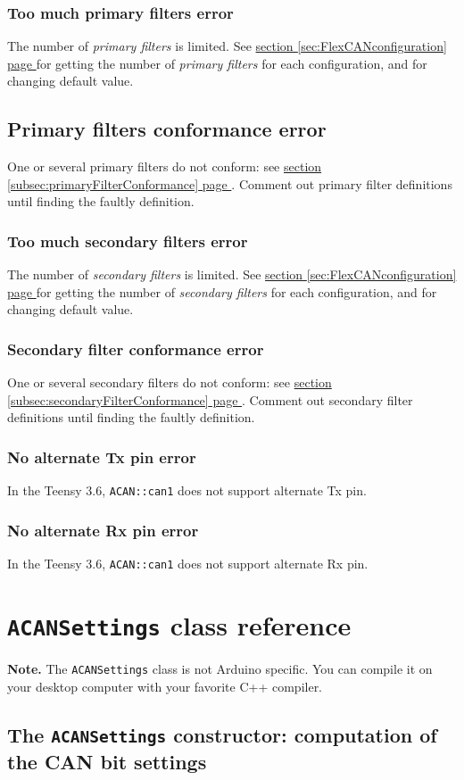 \documentclass[9pt, a4paper, obeyspaces, openany]{extarticle}
\newcommand \sectionLabel[2]{\section{#1}\label{sec:#2}}
\newcommand\refSectionPage[1]{\hyperref[sec:#1]{section \ref*{sec:#1} page \pageref{sec:#1}}}
\newcommand \subsectionLabel[2]{\subsection{#1}\label{subsec:#2}}
\newcommand\refSubsectionPage[1]{\hyperref[subsec:#1]{section \ref*{subsec:#1} page \pageref{subsec:#1}}}
\newcommand \subsubsectionLabel[2]{\subsubsection{#1}\label{subsubsec:#2}}
\begin{document}
\subsubsectionLabel{Too much primary filters error}{tooMuchPrimaryFiltersError}

The number of \emph{primary filters} is limited. See \refSectionPage{FlexCANconfiguration} for getting the number of \emph{primary filters} for each configuration, and for changing default value.

\subsectionLabel{Primary filters  conformance error}{primaryFilterConformanceError}

One or several primary filters do not conform: see \refSubsectionPage{primaryFilterConformance}. Comment out primary filter definitions until finding the faultly definition.


\subsubsectionLabel{Too much secondary filters error}{tooMuchSecondaryFiltersError}

The number of \emph{secondary filters} is limited. See \refSectionPage{FlexCANconfiguration} for getting the number of \emph{secondary filters} for each configuration, and for changing default value.





\subsubsectionLabel{Secondary filter conformance error}{secondaryFilterConformanceError}

One or several secondary filters do not conform: see \refSubsectionPage{secondaryFilterConformance}. Comment out secondary filter definitions until finding the faultly definition.


\subsubsectionLabel{No alternate Tx pin error}{noAlternateTxPinError}

In the Teensy 3.6, \texttt{ACAN::can1} does not support alternate Tx pin.


\subsubsectionLabel{No alternate Rx pin error}{noAlternateRxPinError}

In the Teensy 3.6, \texttt{ACAN::can1} does not support alternate Rx pin.










\sectionLabel{\texttt{ACANSettings} class reference}{ACanSettingsRef}

{\bf Note. } The \texttt{ACANSettings} class is not Arduino specific. You can compile it on your desktop computer with your favorite C++ compiler. 



\subsectionLabel{The \texttt{ACANSettings} constructor: computation of the CAN bit settings}{CANbitSettings}
\end{document}
